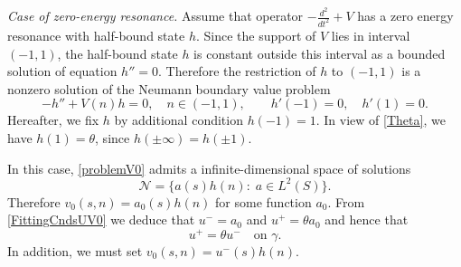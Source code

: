 \documentclass[reqno]{amsart}
\theoremstyle{plain}
\numberwithin{equation}{section}
\newcommand{\pte}{\partial_n}
\begin{document}
%
%



















\textit{Case of zero-energy resonance.}
Assume that operator $-\frac{d^2}{dt^2}+V$ has a zero energy resonance with half-bound state $h$. Since the support of $V$ lies in  interval $(-1,1)$, the half-bound state $h$ is  constant  outside this interval as a bounded solution of equation $h''=0$.
Therefore the restriction of $h$ to $(-1,1)$ is a nonzero solution of the Neumann boundary value problem
\begin{equation}\label{NeumanProblem}
     -h''+V(n)h= 0,\quad n\in(-1,1),\qquad   h'(-1)=0, \quad h'(1)=0.
\end{equation}
Hereafter, we fix $h$ by additional condition $h(-1)=1$. In view of
\eqref{Theta}, we have $h(1)=\theta$, since $h(\pm\infty)=h(\pm 1)$.




In this case, \eqref{problemV0}  admits a infinite-dimensional space of solutions
\begin{equation*}
\mathcal{N}=\big\{a(s)h(n)\colon \;a\in L^2(S)\big\}.
\end{equation*}
Therefore $v_0(s,n)=a_0(s)h(n)$ for some function $a_0$. From \eqref{FittingCndsUV0} we deduce that $u^-=a_0$ and $u^+=\theta a_0$ and hence that
\begin{equation}\label{RCond0}
     u^+=\theta u^-\quad\text {on }\gamma.
\end{equation}
In addition, we must set $v_0(s,n)=u^-(s)h(n)$.
\end{document}
